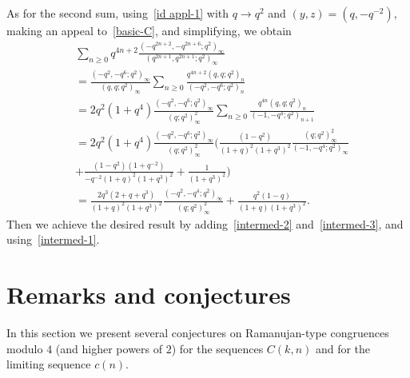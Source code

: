\documentclass[reqno]{amsart}
\theoremstyle{definition}
\theoremstyle{plain}
\theoremstyle{remark}
\numberwithin{equation}{section}
\newcommand{\fr}{\frac}
\begin{document}
%
As for the second sum,
using~\eqref{id appl-1} with $q\to q^2$ and $(y,z)=(q,-q^{-2})$, making an appeal to~\eqref{basic-C}, and simplifying, we obtain
\begin{align}
&\sum_{n\geq 0} q^{4n+2} \fr{(-q^{2n+2},-q^{2n+6};q^2)_\infty}{(q^{2n+1},q^{2n+1};q^2)_\infty} \nonumber \\
&=\fr{(-q^2,-q^6;q^2)_\infty}{(q,q;q^2)_\infty}\sum_{n\geq 0}\fr{q^{4n+2} (q,q;q^2)_n}{(-q^2,-q^6;q^2)_n} \nonumber \\
&=2q^2(1+q^4)\fr{(-q^2,-q^6;q^2)_\infty}{(q;q^2)_\infty^2}\sum_{n \geq 0}\fr{q^{4n}(q,q;q^2)_n}{(-1,-q^4;q^2)_{n+1}} \nonumber \\
&=2q^2(1+q^4)\fr{(-q^2,-q^6;q^2)_\infty}{(q;q^2)_\infty^2}
\Big( \fr{(1-q^2)}{(1+q)^2(1+q^3)^2}\fr{(q;q^2)_\infty^2}{(-1,-q^4;q^2)_\infty} \nonumber \\
&+\fr{(1-q^2)(1+q^{-2}) }{-q^{-2}(1+q)^2(1+q^3)^2} + \fr{1}{(1+q^3)^2} \Big) \nonumber \\
&=\fr{2q^3(2+q+q^3)}{(1+q)^2(1+q^3)^2}\fr{(-q^2,-q^4;q^2)_\infty}{(q;q^2)_\infty^2} + \fr{q^2(1-q)}{(1+q)(1+q^3)^2} \label{intermed-3}.
\end{align}
Then we achieve the desired result by adding~\eqref{intermed-2} and~\eqref{intermed-3}, and using~\eqref{intermed-1}.
%
\section{Remarks and conjectures}\label{sec remarks}
%
In this section we present several conjectures on Ramanujan-type congruences modulo $4$ (and higher powers of $2$)
for the sequences $C(k,n)$ and for the limiting sequence $c(n)$.
\end{document}
